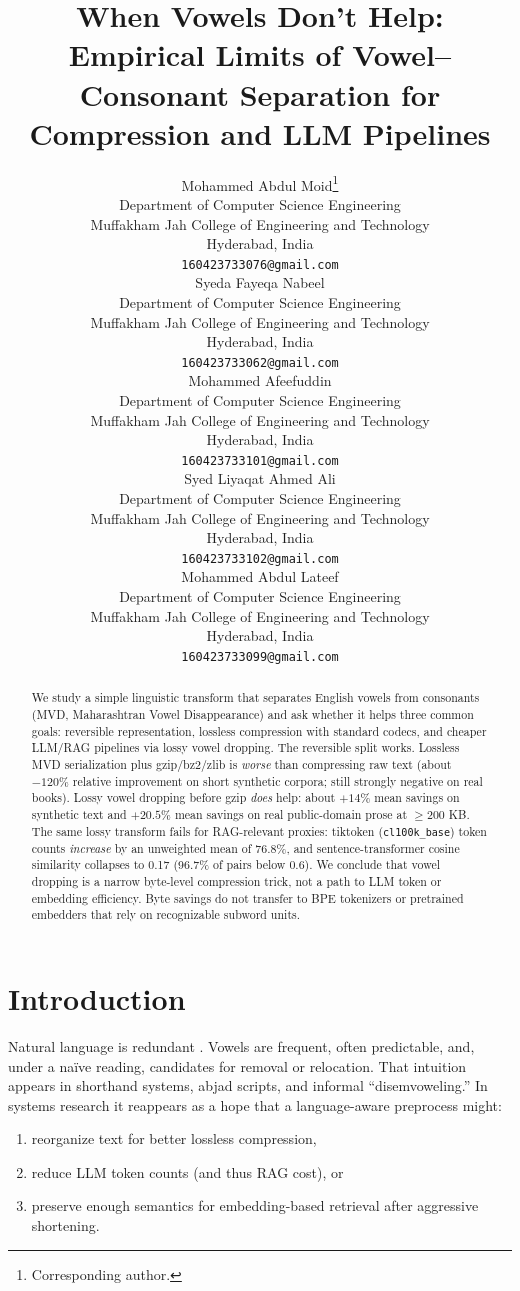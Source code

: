 \documentclass{article}
\title{When Vowels Don't Help: Empirical Limits of Vowel--Consonant Separation for Compression and LLM Pipelines}
\author{
	Mohammed Abdul Moid\thanks{Corresponding author.} \\
	Department of Computer Science Engineering \\
	Muffakham Jah College of Engineering and Technology \\
	Hyderabad, India \\
	\texttt{160423733076@gmail.com} \\
	\And
	Syeda Fayeqa Nabeel \\
	Department of Computer Science Engineering \\
	Muffakham Jah College of Engineering and Technology \\
	Hyderabad, India \\
	\texttt{160423733062@gmail.com} \\
	\And
	Mohammed Afeefuddin \\
	Department of Computer Science Engineering \\
	Muffakham Jah College of Engineering and Technology \\
	Hyderabad, India \\
	\texttt{160423733101@gmail.com} \\
	\And
	Syed Liyaqat Ahmed Ali \\
	Department of Computer Science Engineering \\
	Muffakham Jah College of Engineering and Technology \\
	Hyderabad, India \\
	\texttt{160423733102@gmail.com} \\
	\And
	Mohammed Abdul Lateef \\
	Department of Computer Science Engineering \\
	Muffakham Jah College of Engineering and Technology \\
	Hyderabad, India \\
	\texttt{160423733099@gmail.com} \\
}
\begin{document}
\maketitle

\begin{abstract}
We study a simple linguistic transform that separates English vowels from consonants (MVD, Maharashtran Vowel Disappearance) and ask whether it helps three common goals: reversible representation, lossless compression with standard codecs, and cheaper LLM/RAG pipelines via lossy vowel dropping. The reversible split works. Lossless MVD serialization plus gzip/bz2/zlib is \emph{worse} than compressing raw text (about $-120\%$ relative improvement on short synthetic corpora; still strongly negative on real books). Lossy vowel dropping before gzip \emph{does} help: about $+14\%$ mean savings on synthetic text and $\mathbf{+20.5\%}$ mean savings on real public-domain prose at $\geq 200$ KB. The same lossy transform fails for RAG-relevant proxies: tiktoken (\texttt{cl100k\_base}) token counts \emph{increase} by an unweighted mean of 76.8\%, and sentence-transformer cosine similarity collapses to 0.17 (96.7\% of pairs below 0.6). We conclude that vowel dropping is a narrow byte-level compression trick, not a path to LLM token or embedding efficiency. Byte savings do not transfer to BPE tokenizers or pretrained embedders that rely on recognizable subword units.
\end{abstract}


\section{Introduction}

Natural language is redundant \citep{shannon1948}. Vowels are frequent, often predictable, and, under a na\"ive reading, candidates for removal or relocation. That intuition appears in shorthand systems, abjad scripts, and informal ``disemvoweling.'' In systems research it reappears as a hope that a language-aware preprocess might:

\begin{enumerate}
	\item reorganize text for better lossless compression,
	\item reduce LLM token counts (and thus RAG cost), or
	\item preserve enough semantics for embedding-based retrieval after aggressive shortening.
\end{enumerate}
\end{document}
